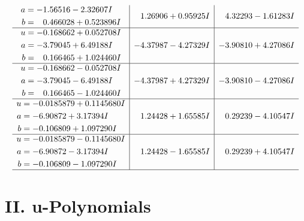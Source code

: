 \documentclass[1p]{elsarticle_modified}
\theoremstyle{definition}
\begin{document}
$$\begin{array}{c|c|c}
\begin{aligned}
a &= -1.56516 - 2.32607 I \\
b &= \phantom{-}0.466028 + 0.523896 I\end{aligned}
 & \phantom{-}1.26906 + 0.95925 I & \phantom{-}4.32293 - 1.61283 I \\ \hline\begin{aligned}
u &= -0.168662 + 0.052708 I \\
a &= -3.79045 + 6.49188 I \\
b &= \phantom{-}0.166465 + 1.024460 I\end{aligned}
 & -4.37987 - 4.27329 I & -3.90810 + 4.27086 I \\ \hline\begin{aligned}
u &= -0.168662 - 0.052708 I \\
a &= -3.79045 - 6.49188 I \\
b &= \phantom{-}0.166465 - 1.024460 I\end{aligned}
 & -4.37987 + 4.27329 I & -3.90810 - 4.27086 I \\ \hline\begin{aligned}
u &= -0.0185879 + 0.1145680 I \\
a &= -6.90872 + 3.17394 I \\
b &= -0.106809 + 1.097290 I\end{aligned}
 & \phantom{-}1.24428 + 1.65585 I & \phantom{-}0.29239 - 4.10547 I \\ \hline\begin{aligned}
u &= -0.0185879 - 0.1145680 I \\
a &= -6.90872 - 3.17394 I \\
b &= -0.106809 - 1.097290 I\end{aligned}
 & \phantom{-}1.24428 - 1.65585 I & \phantom{-}0.29239 + 4.10547 I\\
 \hline 
 \end{array}$$\newpage
\newpage\renewcommand{\arraystretch}{1}
\centering \section*{ II. u-Polynomials}
\end{document}
